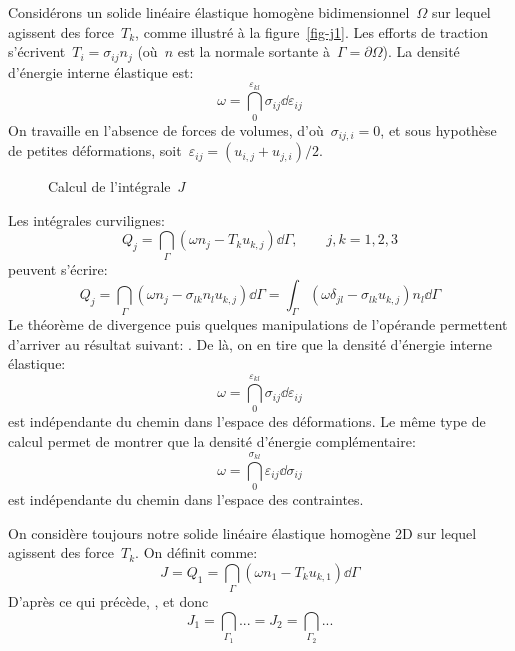 Considérons un solide linéaire élastique homogène bidimensionnel~$\Omega$ sur lequel agissent des force~$T_k$, comme illustré à la figure~\ref{fig-j1}. Les efforts de traction s'écrivent~$T_i=\sigma_{ij}n_j$ (où~$n$ est la normale sortante à~$\Gamma=\partial\Omega$). La densité d'énergie interne élastique est:
\begin{equation}
\omega=\dint_0^{\varepsilon_{kl}} \sigma_{ij}\dd\varepsilon_{ij}
\end{equation}
On travaille en l'absence de forces de volumes, d'où~$\sigma_{ij,i}=0$, et sous hypothèse de petites déformations, soit~$\varepsilon_{ij}=(u_{i,j}+u_{j,i})/2$.
\begin{figure}[ht]
\centering
{}\hspace{5em}
\caption{Calcul de l'intégrale~$J$}
\end{figure}
Les intégrales curvilignes:
\begin{equation}
Q_j =\dint_\Gamma \left(\omega n_j- T_k u_{k,j}\right)\dd\Gamma,\qquad j, k=1,2,3
\end{equation}
peuvent s'écrire:
\begin{equation}
Q_j =\dint_\Gamma \left(\omega n_j- \sigma_{lk}n_l u_{k,j}\right)\dd\Gamma
=\int_\Gamma \left(\omega \delta_{jl}- \sigma_{lk} u_{k,j}\right)n_l \dd\Gamma
\end{equation}
Le théorème de divergence puis quelques manipulations de l'opérande permettent d'arriver au résultat suivant: . De là, on en tire que la densité d'énergie interne élastique:
\begin{equation}\omega=\dint_0^{\varepsilon_{kl}} \sigma_{ij}\dd\varepsilon_{ij}\end{equation}
est indépendante du chemin dans l'espace des déformations. Le même type de calcul permet de montrer que la densité d'énergie complémentaire:
\begin{equation}\omega = \dint_0^{\sigma_{kl}} \varepsilon_{ij}\dd\sigma_{ij}\end{equation}
est indépendante du chemin dans l'espace des contraintes.

\medskip
On considère toujours notre solide linéaire élastique homogène 2D sur lequel agissent des force~$T_k$. On définit  comme:
\begin{equation} J = Q_1 =\dint_\Gamma \left(\omega n_1- T_k u_{k,1}\right)\dd\Gamma \end{equation}
D'après ce qui précède, , et donc
\begin{equation}J_1=\dint_{\Gamma_1} ... = J_2=\dint_{\Gamma_2} ...\end{equation}

